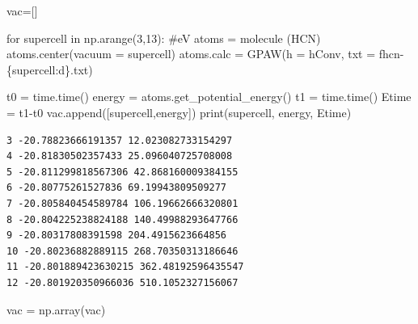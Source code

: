 \documentclass[
  letterpaper,
  DIV=11,
  numbers=noendperiod]{scrreprt}
\newenvironment{Shaded}{\begin{snugshade}}{\end{snugshade}}
\newcommand{\BuiltInTok}[1]{\textcolor[rgb]{0.00,0.23,0.31}{#1}}
\newcommand{\CommentTok}[1]{\textcolor[rgb]{0.37,0.37,0.37}{#1}}
\newcommand{\ControlFlowTok}[1]{\textcolor[rgb]{0.00,0.23,0.31}{#1}}
\newcommand{\DecValTok}[1]{\textcolor[rgb]{0.68,0.00,0.00}{#1}}
\newcommand{\KeywordTok}[1]{\textcolor[rgb]{0.00,0.23,0.31}{#1}}
\newcommand{\NormalTok}[1]{\textcolor[rgb]{0.00,0.23,0.31}{#1}}
\newcommand{\OperatorTok}[1]{\textcolor[rgb]{0.37,0.37,0.37}{#1}}
\newcommand{\SpecialCharTok}[1]{\textcolor[rgb]{0.37,0.37,0.37}{#1}}
\newcommand{\SpecialStringTok}[1]{\textcolor[rgb]{0.13,0.47,0.30}{#1}}
\newcommand{\StringTok}[1]{\textcolor[rgb]{0.13,0.47,0.30}{#1}}
\begin{document}
\begin{Shaded}
\begin{Highlighting}[]
\NormalTok{vac}\OperatorTok{=}\NormalTok{[]}

\ControlFlowTok{for}\NormalTok{ supercell }\KeywordTok{in}\NormalTok{ np.arange(}\DecValTok{3}\NormalTok{,}\DecValTok{13}\NormalTok{): }\CommentTok{\#eV}
\NormalTok{    atoms }\OperatorTok{=}\NormalTok{ molecule (}\StringTok{\textquotesingle{}HCN\textquotesingle{}}\NormalTok{)}
\NormalTok{    atoms.center(vacuum }\OperatorTok{=}\NormalTok{ supercell)}
\NormalTok{    atoms.calc }\OperatorTok{=}\NormalTok{ GPAW(h }\OperatorTok{=}\NormalTok{ hConv, txt }\OperatorTok{=} \SpecialStringTok{f\textquotesingle{}hcn{-}}\SpecialCharTok{\{}\NormalTok{supercell}\SpecialCharTok{:d\}}\SpecialStringTok{.txt\textquotesingle{}}\NormalTok{)}

\NormalTok{    t0 }\OperatorTok{=}\NormalTok{ time.time()}
\NormalTok{    energy }\OperatorTok{=}\NormalTok{ atoms.get\_potential\_energy()}
\NormalTok{    t1 }\OperatorTok{=}\NormalTok{ time.time()}
\NormalTok{    Etime }\OperatorTok{=}\NormalTok{ t1}\OperatorTok{{-}}\NormalTok{t0}
\NormalTok{    vac.append([supercell,energy])}
    \BuiltInTok{print}\NormalTok{(supercell, energy, Etime)}
\end{Highlighting}
\end{Shaded}

\begin{verbatim}
3 -20.78823666191357 12.023082733154297
4 -20.81830502357433 25.096040725708008
5 -20.811299818567306 42.868160009384155
6 -20.80775261527836 69.19943809509277
7 -20.805840454589784 106.19662666320801
8 -20.804225238824188 140.49988293647766
9 -20.80317808391598 204.4915623664856
10 -20.80236882889115 268.70350313186646
11 -20.801889423630215 362.48192596435547
12 -20.801920350966036 510.1052327156067
\end{verbatim}

\begin{Shaded}
\begin{Highlighting}[]
\NormalTok{vac }\OperatorTok{=}\NormalTok{ np.array(vac)}
\end{Highlighting}
\end{Shaded}
\end{document}
